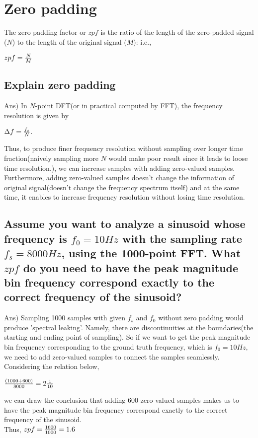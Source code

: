 \documentclass[12pt]{article}%
\begin{document}
\section{Zero padding}
The zero padding factor or $zpf$ is the ratio of the length of the zero-padded signal ($N$) to the length of the original signal ($M$): i.e.,
\begin{center}
    $zpf = {N \over M}$
\end{center}
\subsection{Explain zero padding}
Ans) In $N$-point DFT(or in practical computed by FFT), the frequency resolution is given by
\begin{center}
	$\Delta f = {f_s \over N}.$
\end{center}
Thus, to produce finer frequency resolution without sampling over longer time fraction(naively sampling more $N$ would make poor result since it leads to loose time resolution.), we can increase samples with adding zero-valued samples. Furthermore, adding zero-valued samples doesn't change the information of original signal(doesn't change the frequency spectrum itself) and at the same time, it enables to increase frequency resolution without losing time resolution. 

\subsection{Assume you want to analyze a sinusoid whose frequency is $f_0=10 Hz$ with the sampling rate  $f_s=8000 Hz$, using the 1000-point FFT. What $zpf$ do you need to have the peak magnitude bin frequency correspond exactly to the correct frequency of the sinusoid?}
Ans) Sampling 1000 samples with given $f_s$ and $f_0$ without zero padding would produce 'spectral leaking'. Namely, there are discontinuities at the boundaries(the starting and ending point of sampling). So if we want to get the peak magnitude bin frequency corresponding to the ground truth frequency, which is $f_0 = 10Hz$, we need to add zero-valued samples to connect the samples seamlessly. Considering the relation below, 
\begin{center}
	${(1000 + 600) \over 8000} = 2 {1 \over 10}$
\end{center}
we can draw the conclusion that adding 600 zero-valued samples makes us to have the peak magnitude bin frequency correspond exactly to the correct frequency of the sinusoid. \\
Thus, $zpf = {1600 \over 1000} = 1.6$
\end{document}
